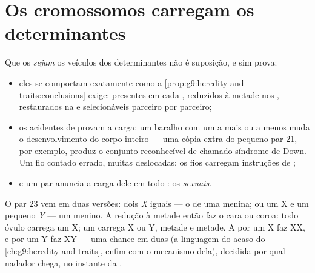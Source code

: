 \section{Os cromossomos carregam os determinantes}

\begin{proposition}\label{prop:g9:chromosomes:evidence}
Que os  \emph{sejam} os veículos dos
determinantes não é suposição, e sim prova:
\begin{itemize}
  \item eles se comportam exatamente como a
        \cref{prop:g9:heredity-and-traits:conclusions}
        exige: presentes em cada , reduzidos à metade
        nos , restaurados na  e
        selecionáveis parceiro por parceiro;
  \item os acidentes de  provam a carga: um
        baralho com um  a mais ou a menos muda o
        desenvolvimento do corpo inteiro --- uma cópia extra
        do pequeno par 21, por exemplo, produz o conjunto
        reconhecível de  chamado síndrome de
        Down. Um fio contado errado, muitas 
        deslocadas: os fios carregam instruções de
        ;
  \item e um par anuncia a carga dele em todo : os
        \emph{ sexuais}.
\end{itemize}
\end{proposition}
\admitted

\begin{definition}\label{def:g9:chromosomes:xy}
O par 23 vem em duas versões: dois  \emph{X}
iguais --- o  de uma menina; ou um X e um pequeno
\emph{Y} --- um menino. A redução à metade então faz o cara
ou coroa: todo óvulo carrega um X; um  carrega
X ou Y, metade e metade. A  por um 
X faz XX, e por um  Y faz XY --- uma chance em
duas (a linguagem do acaso do
\cref{ch:g9:heredity-and-traits}, enfim com o mecanismo
dela), decidida por qual nadador chega, no instante da
.
\end{definition}

